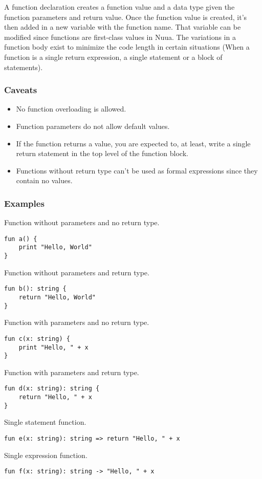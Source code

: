 A function declaration creates a function value and a data type given the function parameters and return value.
Once the function value is created, it's then added in a new variable with the function name. That variable can be
modified since functions are first-class values in Nuua. The variations in a function body exist to minimize the
code length in certain situations (When a function is a single return expression, a single statement or a block of statements).

\subsubsection{Caveats}

\begin{itemize}
    \item No function overloading is allowed.
    \item Function parameters do not allow default values.
    \item If the function returns a value, you are expected to, at least, write a single return statement in the top level of the
        function block.
    \item Functions without return type can't be used as formal expressions since they contain no values.
\end{itemize}

\subsubsection{Examples}

Function without parameters and no return type.
\begin{lstlisting}
fun a() {
    print "Hello, World"
}
\end{lstlisting}
Function without parameters and return type.
\begin{lstlisting}
fun b(): string {
    return "Hello, World"
}
\end{lstlisting}
Function with parameters and no return type.
\begin{lstlisting}
fun c(x: string) {
    print "Hello, " + x
}
\end{lstlisting}
Function with parameters and return type.
\begin{lstlisting}
fun d(x: string): string {
    return "Hello, " + x
}
\end{lstlisting}
Single statement function.
\begin{lstlisting}
fun e(x: string): string => return "Hello, " + x
\end{lstlisting}
Single expression function.
\begin{lstlisting}
fun f(x: string): string -> "Hello, " + x
\end{lstlisting}

